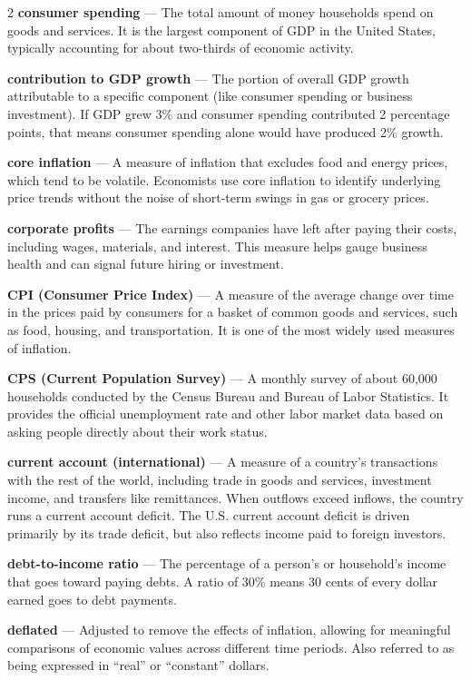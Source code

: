 \begin{multicols}{2}
\textbf{consumer spending} --- The total amount of money households spend on goods and services. It is the largest component of GDP in the United States, typically accounting for about two-thirds of economic activity.

\textbf{contribution to GDP growth} --- The portion of overall GDP growth attributable to a specific component (like consumer spending or business investment). If GDP grew 3\% and consumer spending contributed 2 percentage points, that means consumer spending alone would have produced 2\% growth.

\textbf{core inflation} --- A measure of inflation that excludes food and energy prices, which tend to be volatile. Economists use core inflation to identify underlying price trends without the noise of short-term swings in gas or grocery prices.

\textbf{corporate profits} --- The earnings companies have left after paying their costs, including wages, materials, and interest. This measure helps gauge business health and can signal future hiring or investment.

\textbf{CPI (Consumer Price Index)} --- A measure of the average change over time in the prices paid by consumers for a basket of common goods and services, such as food, housing, and transportation. It is one of the most widely used measures of inflation.

\textbf{CPS (Current Population Survey)} --- A monthly survey of about 60,000 households conducted by the Census Bureau and Bureau of Labor Statistics. It provides the official unemployment rate and other labor market data based on asking people directly about their work status.

\textbf{current account (international)} --- A measure of a country's transactions with the rest of the world, including trade in goods and services, investment income, and transfers like remittances. When outflows exceed inflows, the country runs a current account deficit. The U.S. current account deficit is driven primarily by its trade deficit, but also reflects income paid to foreign investors.

\textbf{debt-to-income ratio} --- The percentage of a person's or household's income that goes toward paying debts. A ratio of 30\% means 30 cents of every dollar earned goes to debt payments.

\textbf{deflated} --- Adjusted to remove the effects of inflation, allowing for meaningful comparisons of economic values across different time periods. Also referred to as being expressed in ``real'' or ``constant'' dollars.


\end{multicols}
